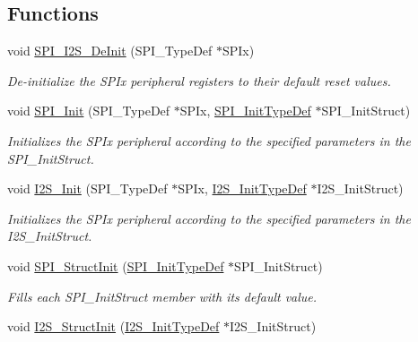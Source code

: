 \subsection*{Functions}
\begin{DoxyCompactItemize}
\item 
void \mbox{\hyperlink{group___s_p_i_gabe36880945fa56785283a9c0092124cc}{S\+P\+I\+\_\+\+I2\+S\+\_\+\+De\+Init}} (S\+P\+I\+\_\+\+Type\+Def $\ast$S\+P\+Ix)
\begin{DoxyCompactList}\small\item\em De-\/initialize the S\+P\+Ix peripheral registers to their default reset values. \end{DoxyCompactList}\item 
void \mbox{\hyperlink{group___s_p_i_ga8dacc1dc48bf08c0f12da409f4889037}{S\+P\+I\+\_\+\+Init}} (S\+P\+I\+\_\+\+Type\+Def $\ast$S\+P\+Ix, \mbox{\hyperlink{struct_s_p_i___init_type_def}{S\+P\+I\+\_\+\+Init\+Type\+Def}} $\ast$S\+P\+I\+\_\+\+Init\+Struct)
\begin{DoxyCompactList}\small\item\em Initializes the S\+P\+Ix peripheral according to the specified parameters in the S\+P\+I\+\_\+\+Init\+Struct. \end{DoxyCompactList}\item 
void \mbox{\hyperlink{group___s_p_i_ga53661884ae4a9640df7cbc59187782f7}{I2\+S\+\_\+\+Init}} (S\+P\+I\+\_\+\+Type\+Def $\ast$S\+P\+Ix, \mbox{\hyperlink{struct_i2_s___init_type_def}{I2\+S\+\_\+\+Init\+Type\+Def}} $\ast$I2\+S\+\_\+\+Init\+Struct)
\begin{DoxyCompactList}\small\item\em Initializes the S\+P\+Ix peripheral according to the specified parameters in the I2\+S\+\_\+\+Init\+Struct. \end{DoxyCompactList}\item 
void \mbox{\hyperlink{group___s_p_i_ga9a0116f88cc2c4478c270f05608703f1}{S\+P\+I\+\_\+\+Struct\+Init}} (\mbox{\hyperlink{struct_s_p_i___init_type_def}{S\+P\+I\+\_\+\+Init\+Type\+Def}} $\ast$S\+P\+I\+\_\+\+Init\+Struct)
\begin{DoxyCompactList}\small\item\em Fills each S\+P\+I\+\_\+\+Init\+Struct member with its default value. \end{DoxyCompactList}\item 
void \mbox{\hyperlink{group___s_p_i_ga7470ec1d0759fdeeb42c7fe71a3b41b7}{I2\+S\+\_\+\+Struct\+Init}} (\mbox{\hyperlink{struct_i2_s___init_type_def}{I2\+S\+\_\+\+Init\+Type\+Def}} $\ast$I2\+S\+\_\+\+Init\+Struct)

\end{DoxyCompactItemize}
